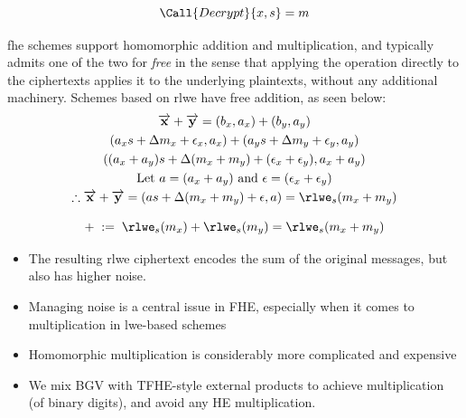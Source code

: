 \begin{definition}[Decryption]
    \begin{equation}
        \Call{Decrypt}{x, s} = m
    \end{equation}
\end{definition}

\gls{fhe} schemes support homomorphic addition and multiplication, and typically admits one of the two for \textit{free} in the sense that applying the operation directly to the ciphertexts applies it to the underlying plaintexts, without any additional machinery. 
Schemes based on \gls{rlwe} have free addition, as seen below:
\begin{gather*}
    \vec{x} + \vec{y} = (b_x, a_x) + (b_y, a_y) \\
    (a_x s + \Delta m_x + \epsilon_x, a_x) + (a_y s + \Delta m_y + \epsilon_y, a_y) \\
    ((a_x +a_y )s + \Delta (m_x+m_y) + (\epsilon_x + \epsilon_y), a_x + a_y) \\
    \text{Let } a = (a_x + a_y) \text{ and } \epsilon = (\epsilon_x + \epsilon_y)\\
    \therefore \vec{x} + \vec{y} = (as + \Delta(m_x + m_y) + \epsilon, a) = \rlwe_s(m_x + m_y)
\end{gather*}

\begin{definition}
    \begin{equation}
        + \;:=\; \rlwe_s(m_x) + \rlwe_s(m_y) = \rlwe_s(m_x + m_y)
    \end{equation}
\end{definition}

\begin{itemize}
    \item The resulting \gls{rlwe} ciphertext encodes the sum of the original messages, but also has higher noise. 
    \item Managing noise is a central issue in FHE, especially when it comes to multiplication in \gls{lwe}-based schemes 
    \item Homomorphic multiplication is considerably more complicated and expensive
    \item We mix BGV with TFHE-style external products to achieve multiplication (of binary digits), and avoid any HE multiplication.
\end{itemize}


